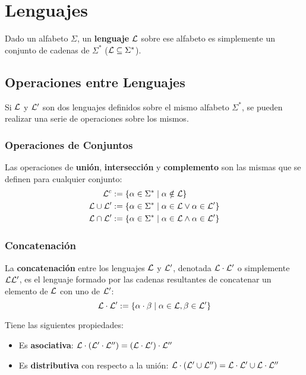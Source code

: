 \section{Lenguajes}

Dado un alfabeto $\Sigma$, un \textbf{lenguaje} $\mathcal{L}$ sobre ese alfabeto es simplemente un conjunto de cadenas de $\Sigma^*$ ($\mathcal{L} \subseteq \Sigma^*$).

\subsection{Operaciones entre Lenguajes}

Si $\mathcal{L}$ y $\mathcal{L}'$ son dos lenguajes definidos sobre el mismo alfabeto $\Sigma^*$, se pueden realizar una serie de operaciones sobre los mismos.

\subsubsection{Operaciones de Conjuntos}

Las operaciones de \textbf{unión}, \textbf{intersección} y \textbf{complemento} son las mismas que se definen para cualquier conjunto:
$$
\begin{aligned}
    \mathcal{L}^c & := \{\alpha \in \Sigma^* \mid \alpha \notin \mathcal{L}\} \\
    \mathcal{L} \cup \mathcal{L}' & := \{\alpha \in \Sigma^* \mid \alpha \in \mathcal{L} \lor \alpha \in \mathcal{L}'\} \\
    \mathcal{L} \cap \mathcal{L}' & := \{\alpha \in \Sigma^* \mid \alpha \in \mathcal{L} \land \alpha \in \mathcal{L}'\} \\
\end{aligned}
$$

\subsubsection{Concatenación}

La \textbf{concatenación} entre los lenguajes $\mathcal{L}$ y $\mathcal{L}'$, denotada $\mathcal{L} \cdot \mathcal{L}'$ o simplemente $\mathcal{L}\mathcal{L}'$, es el lenguaje formado por las cadenas resultantes de concatenar un elemento de $\mathcal{L}$ con uno de $\mathcal{L}'$:
$$\mathcal{L} \cdot \mathcal{L}' := \{\alpha \cdot \beta \mid \alpha \in \mathcal{L}, \beta \in \mathcal{L}'\}$$

Tiene las siguientes propiedades:
\begin{itemize}
    \item Es \textbf{asociativa}: $\mathcal{L} \cdot (\mathcal{L}' \cdot \mathcal{L}'') = (\mathcal{L} \cdot \mathcal{L}') \cdot \mathcal{L}''$
    \item Es \textbf{distributiva} con respecto a la unión: $\mathcal{L} \cdot (\mathcal{L}' \cup \mathcal{L}'') = \mathcal{L} \cdot \mathcal{L}' \cup \mathcal{L} \cdot \mathcal{L}''$
\end{itemize}

